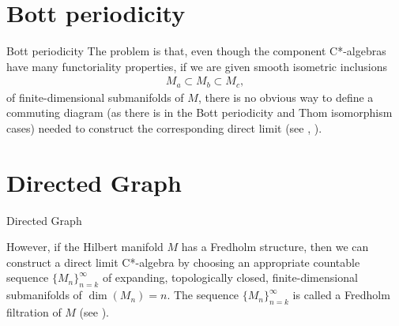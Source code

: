 \documentclass{beamer}
\begin{document}
\section{Bott periodicity}
\begin{frame}{Bott periodicity}
    The problem is that, even though the component C*-algebras have many functoriality properties, if we are given smooth isometric inclusions
        \begin{align*}
            M_{a} \subset M_{b} \subset M_{c},
        \end{align*}
        of finite-dimensional submanifolds of \(M\), there is no obvious way to define a commuting diagram (as there is in the Bott periodicity and Thom isomorphism cases) needed to construct the corresponding direct limit (see {\color{blue}\cite{higson2001}}, {\color{blue}\cite{hajac1999}}).  
\end{frame}
\section{Directed Graph}
\begin{frame}{Directed Graph}
    \begin{center}
    \end{center}
    \parbox{\textwidth}{
        However, if the Hilbert manifold \(M\) has a Fredholm structure, then we can construct a direct limit C*-algebra by choosing an appropriate countable sequence \(\{M_{n}\}_{n=k}^{\infty}\) of expanding, topologically closed, finite-dimensional submanifolds of \(\operatorname{dim}(M_{n}) = n\). The sequence \(\{M_{n}\}_{n=k}^{\infty}\) is called a Fredholm filtration of \(M\) (see {\color{blue}\cite{higson1992}}).
    }
\end{frame}
\end{document}
